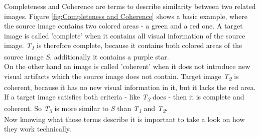 Completeness and Coherence are terms to describe similarity between two related images. Figure \ref{fig:Completeness and Coherence} shows a basic example, where the source image contains two colored areas - a green and a red one. A target image is called 'complete' when it contains all visual information of the source image. \textit{T\textsubscript{1}} is therefore complete, because it contains both colored areas of the source image \textit{S}, additionally it contains a purple star.\\
On the other hand an image is called 'coherent' when it does not introduce new visual artifacts which the source image does not contain. Target image \textit{T\textsubscript{2}} is coherent, because it has no new visual information in it, but it lacks the red area.\\
If a target image satisfies both criteria - like \textit{T\textsubscript{3}} does - then it is complete and coherent. So \textit{T\textsubscript{3}} is more similar to \textit{S} than \textit{T\textsubscript{1}} and \textit{T\textsubscript{2}}.\\
Now knowing what those terms describe it is important to take a look on how they work technically.

